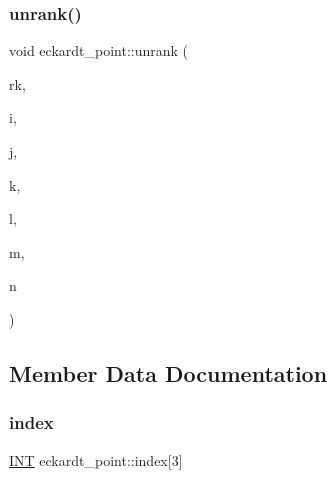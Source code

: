 \mbox{\label{classeckardt__point_a87f835af6bb8684b594f7c46acbb6336}} 
\subsubsection{\texorpdfstring{unrank()}{unrank()}}
{\footnotesize\ttfamily void eckardt\+\_\+point\+::unrank (\begin{DoxyParamCaption}\item[{\mbox{\hyperlink{galois_8h_a09fddde158a3a20bd2dcadb609de11dc}{I\+NT}}}]{rk,  }\item[{\mbox{\hyperlink{galois_8h_a09fddde158a3a20bd2dcadb609de11dc}{I\+NT}} \&}]{i,  }\item[{\mbox{\hyperlink{galois_8h_a09fddde158a3a20bd2dcadb609de11dc}{I\+NT}} \&}]{j,  }\item[{\mbox{\hyperlink{galois_8h_a09fddde158a3a20bd2dcadb609de11dc}{I\+NT}} \&}]{k,  }\item[{\mbox{\hyperlink{galois_8h_a09fddde158a3a20bd2dcadb609de11dc}{I\+NT}} \&}]{l,  }\item[{\mbox{\hyperlink{galois_8h_a09fddde158a3a20bd2dcadb609de11dc}{I\+NT}} \&}]{m,  }\item[{\mbox{\hyperlink{galois_8h_a09fddde158a3a20bd2dcadb609de11dc}{I\+NT}} \&}]{n }\end{DoxyParamCaption})}



\subsection{Member Data Documentation}
\mbox{\label{classeckardt__point_a65784caea35d920cb4a08b30a5ba0604}} 
\subsubsection{\texorpdfstring{index}{index}}
{\footnotesize\ttfamily \mbox{\hyperlink{galois_8h_a09fddde158a3a20bd2dcadb609de11dc}{I\+NT}} eckardt\+\_\+point\+::index\mbox{[}3\mbox{]}}

\mbox{\label{classeckardt__point_a4916b1b09e39328015c0d973e94132e9}} 
